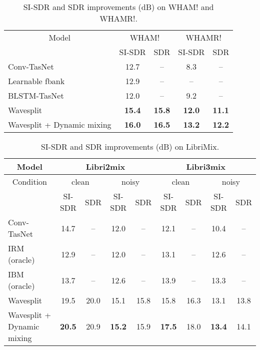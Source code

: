 \documentclass[letterpaper, onecolumn,10 pt]{IEEEtran}
\begin{document}
\begin{table}[t]
    \small
    \centering
    \caption{SI-SDR and SDR improvements (dB) on WHAM! and WHAMR!.}
    \vspace{0.2cm}
    \label{table:wsj0_wham_whamr}
    \begin{tabular}{l|c|c|c|c}
            \hline\hline
            \multicolumn{1}{c|}{Model} & \multicolumn{2}{c|}{WHAM!} & \multicolumn{2}{c}{WHAMR!} \\
            \multicolumn{1}{c|}{} & SI-SDR & SDR  & SI-SDR & SDR  \\
            \hline\hline
            Conv-TasNet \cite{pariente19:filterbankDF, maciejewski19:whamr}              & 12.7 & -- & 8.3 & --\\
            Learnable fbank \cite{pariente19:filterbankDF}          & 12.9 & -- & -- & --\\            
            BLSTM-TasNet \cite{maciejewski19:whamr}     & 12.0 & -- & 9.2 & -- \\\hline
            Wavesplit                                                    &\bf{15.4}&\bf{15.8}& \bf{12.0} & \bf{11.1} \\
            Wavesplit + Dynamic mixing                                   &\bf{16.0}&\bf{16.5}& \bf{13.2} & \bf{12.2} \\
            \hline
    \end{tabular}
\end{table}

\begin{table*}[t]
    \small
    \centering
    \caption{SI-SDR and SDR improvements (dB) on LibriMix.}
    \vspace{0.2cm}
    \label{table:librimix}
    \begin{tabular}{l|c|c|c|c|c|c|c|c}
            \hline\hline
            \multicolumn{1}{c|}{Model} & \multicolumn{4}{c|}{Libri2mix} & \multicolumn{4}{c}{Libri3mix} \\\hline
            \multicolumn{1}{c|}{Condition} & \multicolumn{2}{c|}{clean} & \multicolumn{2}{c}{noisy} & \multicolumn{2}{c|}{clean} & \multicolumn{2}{c}{noisy} \\
            \multicolumn{1}{c|}{} & SI-SDR & SDR  & SI-SDR & SDR & SI-SDR & SDR & SI-SDR & SDR \\
            \hline\hline
            Conv-TasNet \cite{librimix}    & 14.7 & -- & 12.0 & -- & 12.1 & -- & 10.4 & -- \\
            IRM (oracle) \cite{librimix}            & 12.9 & -- & 12.0 & -- & 13.1 & -- & 12.6 & -- \\
            IBM (oracle) \cite{librimix}            & 13.7 & -- & 12.6 & -- & 13.9 & -- & 13.3 & -- \\\hline            
            Wavesplit                       & 19.5 & 20.0 & 15.1 & 15.8 & 15.8 & 16.3 & 13.1 & 13.8 \\
            Wavesplit + Dynamic mixing      & \bf{20.5} & 20.9 & \bf{15.2} & 15.9 & \bf{17.5} & 18.0 & \bf{13.4} & 14.1 \\
            \hline
    \end{tabular}
\end{table*}
\end{document}
